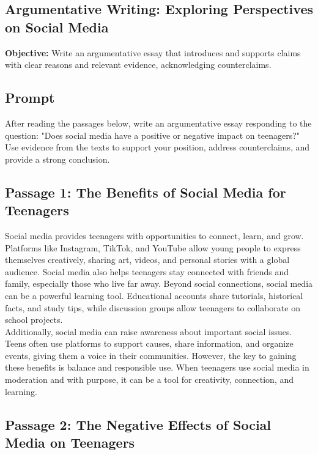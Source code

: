 \documentclass[12pt]{article}
\begin{document}
\subsection*{Argumentative Writing: Exploring Perspectives on Social Media}
\onehalfspacing

\begin{tcolorbox}[colframe=black!40, colback=gray!0, title=Learning Objective]
\textbf{Objective:} Write an argumentative essay that introduces and supports claims with clear reasons and relevant evidence, acknowledging counterclaims.
\end{tcolorbox}

\subsection*{Prompt}

After reading the passages below, write an argumentative essay responding to the question:  
"Does social media have a positive or negative impact on teenagers?" 
Use evidence from the texts to support your position, address counterclaims, and provide a strong conclusion.

\subsection*{Passage 1: The Benefits of Social Media for Teenagers}

Social media provides teenagers with opportunities to connect, learn, and grow. Platforms like Instagram, TikTok, and YouTube allow young people to express \\themselves creatively, sharing art, videos, and personal stories with a global audience. Social media also helps teenagers stay connected with friends and family, especially those who live far away. Beyond social connections, social media can be a powerful learning tool. Educational accounts share tutorials, historical facts, and study tips, while discussion groups allow teenagers to collaborate on school projects. \\Additionally, social media can raise awareness about important social issues. Teens often use platforms to support causes, share information, and organize events, giving them a voice in their communities. However, the key to gaining these benefits is balance and responsible use. When teenagers use social media in moderation and with purpose, it can be a tool for creativity, connection, and learning.
\newpage
\subsection*{Passage 2: The Negative Effects of Social Media on Teenagers}
\end{document}
